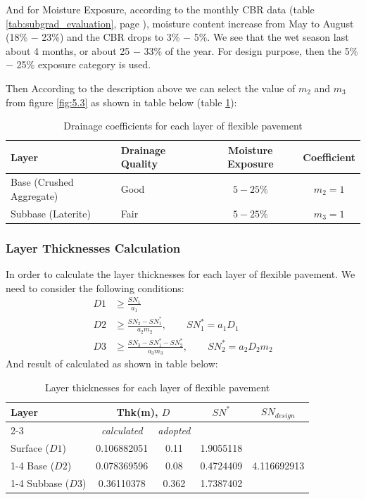 And for Moisture Exposure, according to the monthly CBR data (table \ref{tab:subgrad_evaluation}, page \pageref{tab:subgrad_evaluation}),
moisture content increase from May to August (18\% $-$ 23\%) and the CBR drops to 3\% $-$
5\%. We see that the wet season last about 4 months, or about 25 $-$ 33\% of the year.
For design purpose, then the 5\% $-$ 25\% exposure category is used.

Then According to the description above we can select the value of $m_2$ and $m_3$ from
figure \ref{fig:5.3} as shown in table below (table \ref{tab:drainage_coeff}):

\begin{table}[H]
\centering
\begin{tabular}{llcc}
\toprule
Layer & Drainage Quality & Moisture Exposure & Coefficient \\
\midrule
Base (Crushed Aggregate) & Good & $5 - 25\%$ & $m_2 = 1$ \\
Subbase (Laterite)       & Fair & $5 - 25\%$ & $m_3 = 1$ \\
\bottomrule
\end{tabular}
\caption{Drainage coefficients for each layer of flexible pavement}
\label{tab:drainage_coeff}
\end{table}
\subsubsection*{Layer Thicknesses Calculation}
In order to calculate the layer thicknesses for each layer of flexible pavement. We need to
consider the following conditions:
\begin{align*}
    D1 &\geq \frac{SN_1}{a_1} \\[6pt]
    D2 &\geq \frac{SN_2 - SN_1^*}{a_2 m_2}, \qquad SN_1^* = a_1 D_1 \\[6pt]
    D3 &\geq \frac{SN_3 - SN_1^* - SN_2^*}{a_3 m_3}, \qquad SN_2^* = a_2 D_2 m_2
\end{align*}
And result of calculated as shown in table below:
\begin{table}[h]
\centering
\begin{tabular}{|l|c|c|c|c|}
\hline
\multirow{2}{*}{\textbf{Layer}} & \multicolumn{2}{c|}{\textbf{Thk(m)}, $D$} & \multirow{2}{*}{$SN^*$} & \multirow{2}{*}{$SN_{design}$} \\
\cline{2-3}
 & \textit{calculated} & \textit{adopted} & & \\
\hline
Surface ($D1$) & 0.106882051 & 0.11  & 1.9055118 & \multirow{3}{*}{4.116692913} \\
\cline{1-4}
Base ($D2$)    & 0.078369596 & 0.08  & 0.4724409 & \\
\cline{1-4}
Subbase ($D3$) & 0.36110378  & 0.362 & 1.7387402 & \\
\hline
\end{tabular}
\caption{Layer thicknesses for each layer of flexible pavement}
\label{tab:layer_thickness}
\end{table}